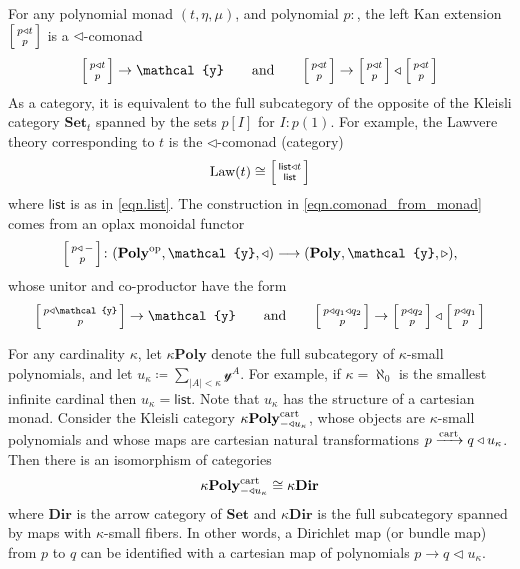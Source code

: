 \documentclass[11pt, one side, article]{memoir}
\makeatletter
\theoremstyle{definition}
\theoremstyle{plain}
\newcommand{\Cat}[1]{\mathbf{#1}}%
\newcommand{\Fun}[1]{\mathsf{#1}}%
\newcommand{\too}{\longrightarrow}
\newcommand{\To}[2][]{\xrightarrow[#1]{\tn{$#2$}}}
\newcommand{\op}{^\tn{op}}
\newcommand{\tn}[1]{\textnormal{#1}}
\newcommand{\smset}{\Cat{Set}}
\newcommand{\List}{\Fun{list}}
\newcommand{\yon}{{\mathcal{y}}}
\newcommand{\poly}{\Cat{Poly}}
\newcommand{\cart}{\tn{cart}}
\newcommand{\polycart}{\poly^\cart}
\newcommand{\0}{\textsf{0}}
\newcommand{\1}{\tn{\textsf{1}}}
\newcommand{\tri}{\mathbin{\triangleleft}}
\newcommand{\irt}{\mathbin{\triangleright}}
\newcommand{\uu}{\List}
\newcommand{\biglens}[2]{
     \begin{bmatrix}{\vphantom{f_f^f}#2} \\ {\vphantom{f_f^f}#1} \end{bmatrix}
}
\newcommand{\littlelens}[2]{
     \begin{bsmallmatrix}{\vphantom{f}#2} \\ {\vphantom{f}#1} \end{bsmallmatrix}
}
\newcommand{\lens}[2]{
  \relax\if@display
     \biglens{#1}{#2}
  \else
     \littlelens{#1}{#2}
  \fi
}
\newcommand{\hh}[2][]{#1 \tn{#2} #1}
\newcommand{\qqand}{\hh[\qquad]{and}}
\makeatother
\begin{document}
For any polynomial monad $(t,\eta,\mu)$, and polynomial $p\colon$, the left Kan extension $\lens{p}{p\tri t}$ is a $\tri$-comonad
\begin{equation}\label{eqn.comonad_from_monad}
  \lens{p}{p\tri t}\to\yon
  \qqand
  \lens{p}{p\tri t}\to\lens{p}{p\tri t}\tri\lens{p}{p\tri t}
\end{equation}
As a category, it is equivalent to the full subcategory of the opposite of the Kleisli category $\smset_t$ spanned by the sets $p[I]$ for $I:p(1)$. For example, the Lawvere theory corresponding to $t$ is the $\tri$-comonad (category)
\begin{equation}
	\text{Law}(t)\cong\lens{\uu}{\uu\tri t}
\end{equation}
where $\uu$ is as in \eqref{eqn.list}. The construction in \eqref{eqn.comonad_from_monad} comes from an oplax monoidal functor
\begin{equation}
	\lens{p}{p\tri\,-}\colon(\poly\op,\yon,\tri)\too(\poly,\yon,\irt),
\end{equation}
whose unitor and co-productor have the form
\begin{equation}
	\lens{p}{p\tri\yon}\to\yon
  \qqand
	\lens{p}{p\tri q_1\tri q_2}\to\lens{p}{p\tri q_2}\tri\lens{p}{p\tri q_1}
\end{equation}

For any cardinality $\kappa$, let $\kappa\poly$ denote the full subcategory of $\kappa$-small polynomials, and let $u_\kappa\coloneqq\sum_{|A|<\kappa}\yon^A$. For example, if $\kappa=\aleph_0$ is the smallest infinite cardinal then $u_\kappa=\uu$. Note that $u_\kappa$ has the structure of a cartesian monad. Consider the Kleisli category $\kappa\polycart_{-\tri u_\kappa}$, whose objects are $\kappa$-small polynomials and whose maps are cartesian natural transformations $p\To{\tn{cart}} q\tri u_\kappa$. Then there is an isomorphism of categories
\begin{equation}
	\kappa\polycart_{-\tri u_\kappa}\cong\kappa\Cat{Dir}
\end{equation}
where $\Cat{Dir}$ is the arrow category of $\smset$ and $\kappa\Cat{Dir}$ is the full subcategory spanned by maps with $\kappa$-small fibers. In other words, a Dirichlet map (or bundle map) from $p$ to $q$ can be identified with a cartesian map of polynomials $p\to q\tri u_\kappa$.
\end{document}

